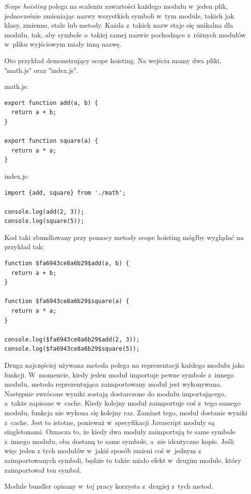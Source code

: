 \documentclass{SGGW-thesis}
\begin{document}
\emph{Scope hoisting} polega na scaleniu zawartości każdego modułu w~jeden plik, jednocześnie zmieniając nazwy wszystkich symboli w~tym module, takich jak klasy, zmienne, stałe lub metody. Każda z~takich nazw staje się unikalna dla modułu, tak, aby symbole o~takiej samej nazwie pochodzące z~różnych modułów w~pliku wyjściowym miały inną nazwę.

Oto przykład demonstrujący scope hoisting. Na wejściu mamy dwa pliki, "math.js" oraz "index.js".

math.js:
\begin{verbatim}
export function add(a, b) {
  return a + b;
}

export function square(a) {
  return a * a;
}
\end{verbatim}

index.js:
\begin{verbatim}
import {add, square} from './math';

console.log(add(2, 3));
console.log(square(5));
\end{verbatim}

Kod taki zbundlowany przy pomocy metody scope hoisting mógłby wyglądać na przykład tak:

\begin{verbatim}
function $fa6943ce8a6b29$add(a, b) {
  return a + b;
}

function $fa6943ce8a6b29$square(a) {
  return a * a;
}

console.log($fa6943ce8a6b29$add(2, 3));
console.log($fa6943ce8a6b29$square(5));
\end{verbatim}

Druga najczęściej używana metoda polega na reprezentacji każdego modułu jako funkcji. W~momencie, kiedy jeden moduł importuje pewne symbole z~innego modułu, metoda reprezentująca zaimportowany moduł jest wykonywana. Następnie zwrócone wyniki zostają dostarczone do modułu importującego, a~także zapisane w~cache. Kiedy kolejny moduł zaimportuje coś z~tego samego modułu, funkcja nie wykona się kolejny raz. Zamiast tego, moduł dostanie wyniki z~cache. Jest to istotne, ponieważ w~specyfikacji Javascript moduły są singletonami\cite{object_oriented_javascript}. Oznacza to, że kiedy dwa moduły zaimportują te same symbole z~innego modułu, oba dostaną te same symbole, a~nie identyczne kopie. Jeśli więc jeden z tych modułów w~jakiś sposób zmieni coś w~jednym z zaimportowanych symboli, będzie to także miało efekt w~drugim module, który zaimportował ten symbol.

Module bundler opisany w~tej pracy korzysta z~drugiej z~tych metod.
\end{document}
